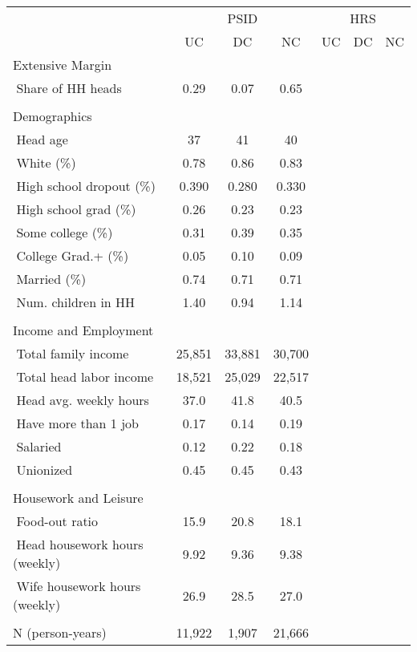 \begin{tabular}{l*{6}{c}} \hline
&\multicolumn{3}{c}{PSID}&\multicolumn{3}{c}{HRS}\\\cmidrule(lr){2-4}\cmidrule(lr){5-7}
 & UC & DC & NC & UC & DC & NC \\ \hline
Extensive Margin &  &  & &&& \\
$\;$Share of HH heads & 0.29 & 0.07 & 0.65 &&&\\
 &  &  & &&& \\
Demographics &  &  &  &&&\\
$\;$Head age & 37& 41 & 40 &&&\\
$\;$White (\%) & 0.78 & 0.86 & 0.83 &&&\\
$\;$High school dropout (\%) & 0.390 & 0.280 & 0.330 &&&\\
$\;$High school grad (\%) & 0.26 & 0.23 & 0.23 &&&\\
$\;$Some college (\%) & 0.31 & 0.39 & 0.35 &&&\\
$\;$College Grad.+ (\%) & 0.05 & 0.10 & 0.09 &&&\\
$\;$Married (\%) & 0.74 & 0.71 & 0.71 &&&\\
$\;$Num. children in HH & 1.40 & 0.94 & 1.14 &&&\\
 &  &  &  &&&\\
Income and Employment &  &  &  &&&\\
$\;$Total family income & 25,851 & 33,881 & 30,700&&& \\
$\;$Total head labor income & 18,521 & 25,029 & 22,517 &&&\\
$\;$Head avg. weekly hours & 37.0 & 41.8 & 40.5&&& \\
$\;$Have more than 1 job & 0.17 & 0.14 & 0.19&&& \\
$\;$Salaried & 0.12 & 0.22 & 0.18&&& \\
$\;$Unionized & 0.45 & 0.45 & 0.43 &&&\\
 &  &  & &&&\\
Housework and Leisure &  &  &  &&&\\
$\;$Food-out ratio & 15.9 & 20.8 & 18.1 &&& \\
$\;$Head housework hours (weekly) & 9.92 & 9.36 & 9.38&&& \\
$\;$Wife housework hours (weekly) & 26.9 & 28.5 & 27.0&&& \\
 &  &  & &&& \\
 N (person-years) & 11,922 & 1,907 & 21,666 &&&\\ \hline
\end{tabular}
